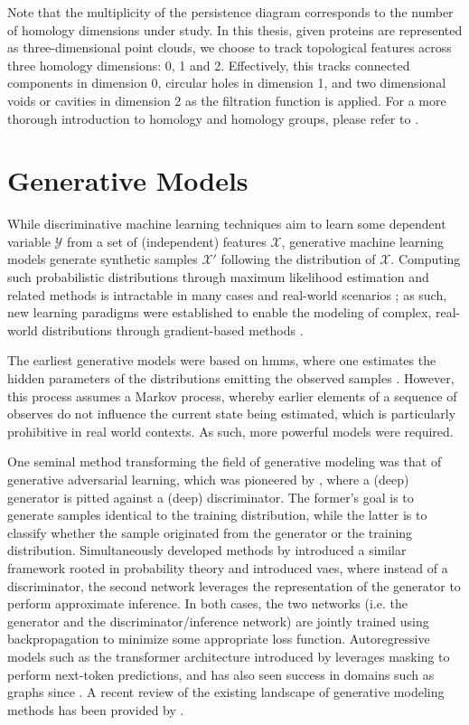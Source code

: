 Note that the multiplicity of the persistence diagram corresponds to the number
of homology dimensions under study. In this thesis, given proteins are
represented as three-dimensional point clouds, we choose to track topological
features across three homology dimensions: 0, 1 and 2. Effectively, this tracks
connected components in dimension 0, circular holes in dimension 1, and two
dimensional voids or cavities in dimension 2 as the filtration function is
applied. For a more thorough introduction to homology and homology groups,
please refer to \cite{edelsbrunner2010computational}.

\section{Generative Models}\label{genmodels}

While discriminative machine learning techniques aim to learn some dependent
variable $\mathcal{Y}$ from a set of (independent) features $\mathcal{X}$,
generative machine learning models generate synthetic samples $\mathcal{X}'$
following the distribution of $\mathcal{X}$. Computing such probabilistic
distributions through maximum likelihood estimation and related methods is
intractable in many cases \citep{rayner2002numerical,drovandi2011likelihood} and
real-world scenarios \citep{yildirim2015parameter}; as such, new
learning paradigms were established to enable the modeling of complex,
real-world distributions through gradient-based methods \citep{bond2021deep}.

The earliest generative models were based on \acrfull{hmms}, where one estimates
the hidden parameters of the distributions emitting the observed samples
\citep{baum1968growth, baum1970maximization}. However, this process assumes a
Markov process, whereby earlier elements of a sequence of observes do not
influence the current state being estimated, which is particularly prohibitive
in real world contexts. As such, more powerful models were required.

One seminal method transforming the field of generative modeling was that
of generative adversarial learning, which was pioneered by
\cite{goodfellow2014generative}, where a (deep) generator is pitted against a
(deep) discriminator. The former's goal is to generate samples identical to the
training distribution, while the latter is to classify whether the sample
originated from the generator or the training distribution. Simultaneously
developed methods by \cite{kingma2013auto} introduced a similar framework rooted
in probability theory and introduced \acrfull{vaes}, where instead
of a discriminator, the second network leverages the representation of the
generator to perform approximate inference. In both cases, the two networks
(i.e. the generator and the discriminator/inference network) are jointly trained
using backpropagation to minimize some appropriate loss function. Autoregressive
models such as the transformer architecture introduced by
\cite{vaswani2017attention} leverages masking to perform next-token predictions,
and has also seen success in domains such as graphs since
\citep{you2018graphrnn}. A recent review of the existing landscape of generative
modeling methods has been provided by \cite{bond2021deep}.

